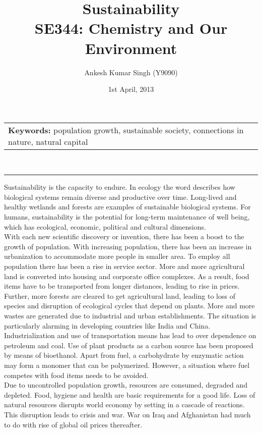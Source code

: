 \documentclass[pdftex,12pt,a4paper]{article}
\title{\vspace{-15pt}Sustainability\\ SE344: Chemistry and Our Environment}
\author{Ankesh Kumar Singh (Y9090)}
\date{1st April, 2013}
\begin{document}
\maketitle
\begin{tabular}{p{370pt}}
\textbf{Keywords: }population growth, sustainable society, connections in nature, natural capital
\end{tabular}
\vspace{10pt}\\
\hrule
\vspace{10pt}
Sustainability is the capacity to endure. In ecology the word describes how biological systems remain diverse and productive over time. Long-lived and healthy wetlands and forests are examples of sustainable biological systems. For humans, sustainability is the potential for long-term maintenance of well being, which has ecological, economic, political and cultural dimensions.\\

With each new scientific discovery or invention, there has been a boost to the growth of population. With increasing population, there has been an increase in urbanization to accommodate more people in smaller area. To employ all population there has been a rise in service sector. More and more agricultural land is converted into housing and corporate office complexes. As a result, food items have to be transported from longer distances, leading to rise in prices. Further, more forests are cleared to get agricultural land, leading to loss of species and disruption of ecological cycles that depend on plants. More and more wastes are generated due to industrial and urban establishments. The situation is particularly alarming in developing countries like India and China.\\

Industrialization and use of transportation means has lead to over dependence on petroleum and coal. Use of plant products as a carbon source has been proposed by means of bioethanol. Apart from fuel, a carbohydrate by enzymatic action may form a monomer that can be polymerized. However, a situation where fuel competes with food items needs to be avoided.\\

Due to uncontrolled population growth, resources are consumed, degraded and depleted. Food, hygiene and health are basic requirements for a good life. Loss of natural resources disrupts world economy by setting in a cascade of reactions. This disruption leads to crisis and war. War on Iraq and Afghanistan had much to do with rise of global oil prices thereafter.\\
\end{document}

